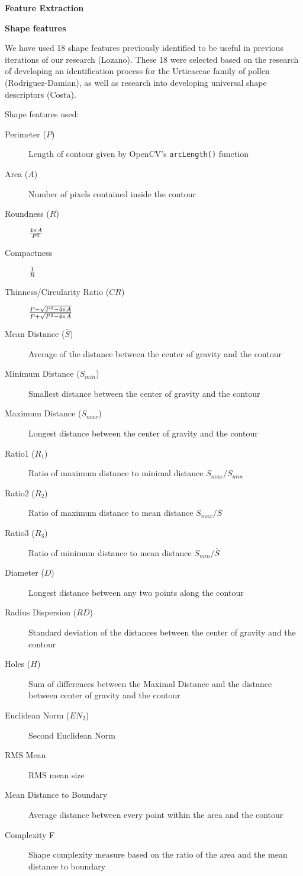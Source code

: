 \textbf{Feature Extraction}

\textbf{Shape features}

We have used 18 shape features previously identified to be useful in previous iterations of our research (Lozano). These 18 were selected based on the research of developing an identification process for the Urticaceae family of pollen (Rodriguez-Damian), as well as research into developing universal shape descriptors (Costa).

Shape features used:

\begin{description}
\item[Perimeter ($P$)] Length of contour given by OpenCV's \verb|arcLength()| function
\item[Area ($A$)] Number of pixels contained inside the contour
\item[Roundness ($R$)] $4\pi A \over P^2$
\item[Compactness] $1 \over R$
\item[Thinness/Circularity Ratio ($CR$)] $P-\sqrt{P^2-4\pi A} \over P+\sqrt{P^2-4\pi A}$
\item[Mean Distance ($\bar{S}$)] Average of the distance between the center of gravity and the contour
\item[Minimum Distance ($S_{min}$)] Smallest distance between the center of gravity and the contour
\item[Maximum Distance ($S_{max}$)] Longest distance between the center of gravity and the contour
\item[Ratio1 ($R_1$)] Ratio of maximum distance to minimal distance $S_{max} / S_{min}$
\item[Ratio2 ($R_2$)] Ratio of maximum distance to mean distance $S_{max} / \bar{S}$
\item[Ratio3 ($R_3$)] Ratio of minimum distance to mean distance $S_{min}/ \bar{S}$
\item[Diameter ($D$)] Longest distance between any two points along the contour
\item[Radius Dispersion ($RD$)] Standard deviation of the distances between the center of gravity and the contour
\item[Holes ($H$)] Sum of differences between the Maximal Distance and the distance between center of gravity and the contour
\item[Euclidean Norm ($EN_2$)] Second Euclidean Norm
\item[RMS Mean] RMS mean size
\item[Mean Distance to Boundary] Average distance between every point within the area and the contour
\item[Complexity F] Shape complexity measure based on the ratio of the area and the mean distance to boundary
\end{description}



  
  
  
  
  
  
  
  